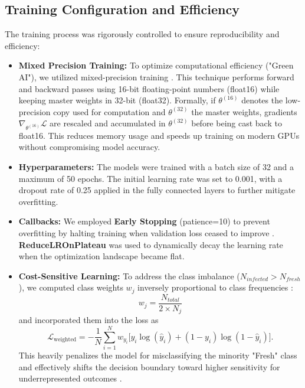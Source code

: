 \documentclass[12pt,a4paper]{article}
\begin{document}
\subsection{Training Configuration and Efficiency}
The training process was rigorously controlled to ensure reproducibility and efficiency:
\begin{itemize}
    \item \textbf{Mixed Precision Training:} To optimize computational efficiency ("Green AI"), we utilized mixed-precision training \citep{BIAZI2023102360}. This technique performs forward and backward passes using 16-bit floating-point numbers (float16) while keeping master weights in 32-bit (float32). Formally, if $\theta^{(16)}$ denotes the low-precision copy used for computation and $\theta^{(32)}$ the master weights, gradients $\nabla_{\theta^{(16)}} \mathcal{L}$ are rescaled and accumulated in $\theta^{(32)}$ before being cast back to float16. This reduces memory usage and speeds up training on modern GPUs without compromising model accuracy.
    \item \textbf{Hyperparameters:} The models were trained with a batch size of 32 and a maximum of 50 epochs. The initial learning rate was set to 0.001, with a dropout rate of 0.25 applied in the fully connected layers to further mitigate overfitting.
    \item \textbf{Callbacks:} We employed \textbf{Early Stopping} (patience=10) to prevent overfitting by halting training when validation loss ceased to improve \citep{BejaniGhatee2021}. \textbf{ReduceLROnPlateau} was used to dynamically decay the learning rate when the optimization landscape became flat.
    \item \textbf{Cost-Sensitive Learning:} To address the class imbalance ($N_{infected} > N_{fresh}$), we computed class weights $w_j$ inversely proportional to class frequencies \citep{s23042333}:
    \begin{equation}
        w_j = \frac{N_{total}}{2 \times N_j}
    \end{equation}
    and incorporated them into the loss as
    \begin{equation}
        \mathcal{L}_{\text{weighted}} = -\frac{1}{N} \sum_{i=1}^{N} w_{y_i} \Big[ y_i \log(\hat{y}_i) + (1-y_i) \log(1-\hat{y}_i) \Big].
    \end{equation}
    This heavily penalizes the model for misclassifying the minority "Fresh" class and effectively shifts the decision boundary toward higher sensitivity for underrepresented outcomes \citep{CHEN2025109507}.
\end{itemize}
\end{document}
